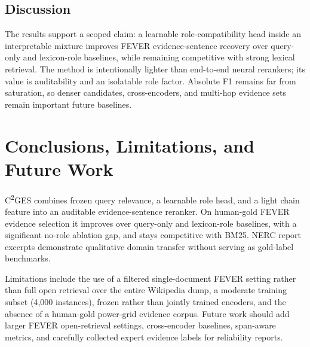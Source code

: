 \documentclass[cmc,article,submit,moreauthors,pdftex]{Definitions/tsp}
\newcommand{\cges}{C\textsuperscript{2}GES}
\begin{document}
\subsection{Discussion}
The results support a scoped claim: a learnable role-compatibility head inside an interpretable mixture improves FEVER evidence-sentence recovery over query-only and lexicon-role baselines, while remaining competitive with strong lexical retrieval. The method is intentionally lighter than end-to-end neural rerankers; its value is auditability and an isolatable role factor. Absolute F1 remains far from saturation, so denser candidates, cross-encoders, and multi-hop evidence sets remain important future baselines.

\section{Conclusions, Limitations, and Future Work}
\label{sec:conclusion}

\cges{} combines frozen query relevance, a learnable role head, and a light chain feature into an auditable evidence-sentence reranker. On human-gold FEVER evidence selection it improves over query-only and lexicon-role baselines, with a significant no-role ablation gap, and stays competitive with BM25. NERC report excerpts demonstrate qualitative domain transfer without serving as gold-label benchmarks.

Limitations include the use of a filtered single-document FEVER setting rather than full open retrieval over the entire Wikipedia dump, a moderate training subset (4{,}000 instances), frozen rather than jointly trained encoders, and the absence of a human-gold power-grid evidence corpus. Future work should add larger FEVER open-retrieval settings, cross-encoder baselines, span-aware metrics, and carefully collected expert evidence labels for reliability reports.



\end{document}

